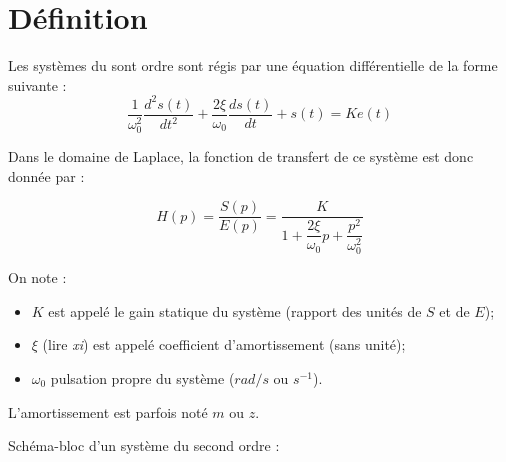 \documentclass[10pt,fleqn]{article} %
\begin{document}


%
%


\section{Définition}


Les systèmes du sont ordre sont régis par une équation différentielle de la
forme suivante :
$$
\dfrac{1}{\omega_0^2} \dfrac{d^2 s(t)}{dt^2}+\dfrac{2\xi}{\omega_0} \dfrac{d s(t)}{dt}+s(t) = Ke(t)
$$



\begin{defi}
Dans le domaine de Laplace, la fonction de transfert de ce système est donc
donnée par :

$$
H(p) 
= \dfrac{S(p)}{E(p)} 
= \dfrac{K}{1+ \dfrac{2\xi}{\omega_0}p+\dfrac{p^2}{\omega_0^2}}
$$

On note :
\begin{itemize}
\item $K$ est appelé le gain statique du système (rapport des unités de $S$ et de $E$);
\item $\xi$ (lire \textit{xi}) est appelé coefficient d'amortissement (sans unité);
\item $\omega_0$ pulsation propre du système ($rad/s$ ou $s^{-1}$).
\end{itemize}

\end{defi}
L'amortissement est parfois noté $m$ ou $z$.



Schéma-bloc d'un système du second ordre :


\begin{center}
\end{center}
\end{document}
